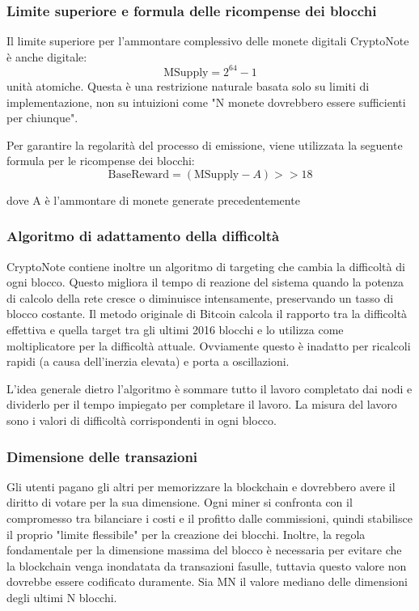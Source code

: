\subsubsection{Limite superiore e formula delle ricompense dei blocchi}
Il limite superiore per l'ammontare complessivo delle
monete digitali CryptoNote è anche digitale:
\[\text{MSupply} = 2^{64} - 1\] unità atomiche. Questa è una restrizione
naturale basata solo su limiti di implementazione, non su intuizioni
come "N monete dovrebbero essere sufficienti per chiunque".

Per garantire la regolarità del processo di emissione, viene utilizzata
la seguente formula per le ricompense dei blocchi: \[
\text{BaseReward} = (\text{MSupply} - A) >> 18 \]

dove A è l'ammontare di monete generate precedentemente

\subsubsection{Algoritmo di adattamento della difficoltà}
CryptoNote contiene inoltre un algoritmo di targeting che cambia la difficoltà
di ogni blocco. Questo migliora il tempo di reazione del sistema quando
la potenza di calcolo della rete cresce o diminuisce intensamente,
preservando un tasso di blocco costante. Il metodo originale di Bitcoin
calcola il rapporto tra la difficoltà effettiva e quella target tra gli
ultimi 2016 blocchi e lo utilizza come moltiplicatore per la difficoltà
attuale. Ovviamente questo è inadatto per ricalcoli rapidi (a causa
dell'inerzia elevata) e porta a oscillazioni.

L'idea generale dietro l'algoritmo è sommare tutto il
lavoro completato dai nodi e dividerlo per il tempo impiegato per
completare il lavoro. La misura del lavoro sono i valori di difficoltà
corrispondenti in ogni blocco.

\subsubsection{Dimensione delle transazioni}
Gli utenti pagano gli altri per memorizzare la blockchain e dovrebbero
avere il diritto di votare per la sua dimensione. Ogni miner si
confronta con il compromesso tra bilanciare i costi e il profitto dalle
commissioni, quindi stabilisce il proprio "limite flessibile" per la
creazione dei blocchi. Inoltre, la regola fondamentale per la dimensione
massima del blocco è necessaria per evitare che la blockchain venga
inondatata da transazioni fasulle, tuttavia questo valore non dovrebbe
essere codificato duramente. Sia MN il valore mediano delle dimensioni
degli ultimi N blocchi.

